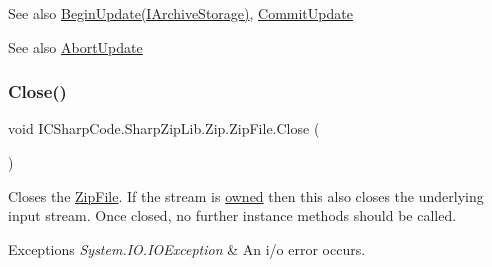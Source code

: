 \begin{DoxySeeAlso}{See also}
\hyperlink{class_i_c_sharp_code_1_1_sharp_zip_lib_1_1_zip_1_1_zip_file_a3e889f07213ddc9dfd9876875f017374}{Begin\+Update(\+I\+Archive\+Storage)}, \hyperlink{class_i_c_sharp_code_1_1_sharp_zip_lib_1_1_zip_1_1_zip_file_a047075c793bc97073b0531d6d0317bd9}{Commit\+Update}


\end{DoxySeeAlso}


\begin{DoxySeeAlso}{See also}
\hyperlink{class_i_c_sharp_code_1_1_sharp_zip_lib_1_1_zip_1_1_zip_file_a2c0a4ecff350786d09c0e4ad0e15fdc8}{Abort\+Update}


\end{DoxySeeAlso}
\mbox{\label{class_i_c_sharp_code_1_1_sharp_zip_lib_1_1_zip_1_1_zip_file_aeb7e59b277d058f45aa417cb07b4b1d3}} 
\subsubsection{\texorpdfstring{Close()}{Close()}}
{\footnotesize\ttfamily void I\+C\+Sharp\+Code.\+Sharp\+Zip\+Lib.\+Zip.\+Zip\+File.\+Close (\begin{DoxyParamCaption}{ }\end{DoxyParamCaption})\hspace{0.3cm}{\ttfamily [inline]}}



Closes the \hyperlink{class_i_c_sharp_code_1_1_sharp_zip_lib_1_1_zip_1_1_zip_file}{Zip\+File}. If the stream is \hyperlink{class_i_c_sharp_code_1_1_sharp_zip_lib_1_1_zip_1_1_zip_file_a12922b0e2e600c62cfe743aba809ff7c}{owned} then this also closes the underlying input stream. Once closed, no further instance methods should be called. 


\begin{DoxyExceptions}{Exceptions}
{\em System.\+I\+O.\+I\+O\+Exception} & An i/o error occurs. \\
\hline
\end{DoxyExceptions}
\mbox{\label{class_i_c_sharp_code_1_1_sharp_zip_lib_1_1_zip_1_1_zip_file_a047075c793bc97073b0531d6d0317bd9}} 
